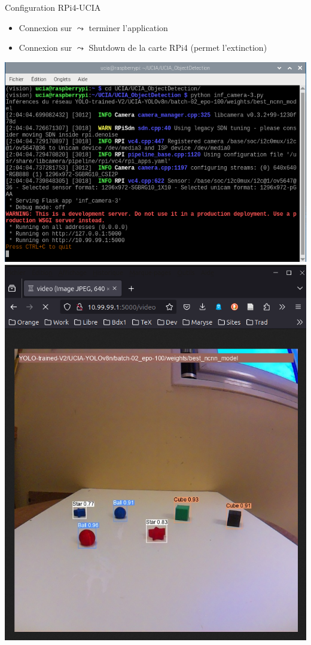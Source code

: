 \documentclass[11pt,serif,mathserif,compress,hyperref={colorlinks}]{beamer}
\begin{document}
\begin{frame}{Configuration RPi4-UCIA}
\begin{tcolorbox}[title={Programmes Python d'exploitation des réseaux YOLO}, add to width=.7cm, height=68mm]
{\begin{itemize}
\begin{itemize}
        \item Connexion sur  $\leadsto$ terminer l'application\\
        \item Connexion sur  $\leadsto$ Shutdown de la carte RPi4 (permet l'extinction)
        \end{itemize}
          {\vspace*{-6cm}\includegraphics[width=.9\textwidth]{images/detect_camera-3_a.png}}
         {\vspace*{-7.5cm}\includegraphics[width=.65\textwidth]{images/detect_camera-3_b.png}}

\end{itemize}}
\end{tcolorbox}
\end{frame}
\end{document}
